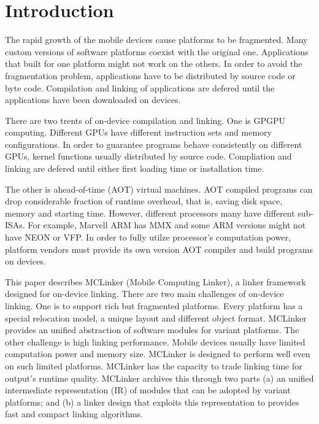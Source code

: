 \section{Introduction}

The rapid growth of the mobile devices cause platforms to be fragmented. Many custom versions of software platforms coexist with the original one. Applications that built for one platform might not work on the others. In order to avoid the fragmentation problem, applications have to be distributed by source code or byte code. Compilation and linking of applications are defered until the applications have been downloaded on devices.

There are two trents of on-device compilation and linking. One is GPGPU computing. Different GPUs have different instruction sets and memory configurations. In order to guarantee programs behave consistently on different GPUs, kernel functions usually distributed by source code. Compliation and linking are defered until either first loading time or installation time.

The other is ahead-of-time (AOT) virtual machines. AOT compiled programs can drop considerable fraction of runtime overhead, that is, saving disk space, memory and starting time. However, different processors many have different sub-ISAs. For example, Marvell ARM has MMX and some ARM versions might not have NEON or VFP. In order to fully utilze processor's computation power, platform vendors must provide its own version AOT compiler and build programs on devices.

This paper describes MCLinker (Mobile Computing Linker), a linker framework designed for on-device linking. There are two main challenges of on-device linking. One is to support rich but fragmented platforms. Every platform has a special relocation model, a unique layout and different object format. MCLinker provides an unified abstraction of software modules for variant platforms. The other challenge is high linking performance. Mobile devices usually have limited computation power and memory size. MCLinker is designed to perform well even on such limited platforms. MCLinker has the capacity to trade linking time for output's runtime quality. MCLinker archives this through two parts (a) an unified intermediate representation (IR) of modules that can be adopted by variant platforms; and (b) a linker design that exploits this representation to provides fast and compact linking algorithms.


